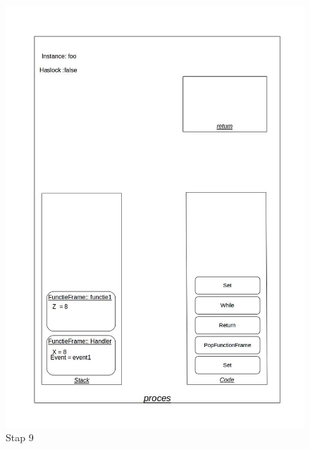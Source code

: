 \documentclass[]{article}
\begin{document}
\begin{figure}[H]
\centering
\includegraphics[scale=0.4]{AnalyseADTAlgorithm/processtappen/stap7.jpg}
\caption{Stap 9}
\end{figure}
\end{document}
